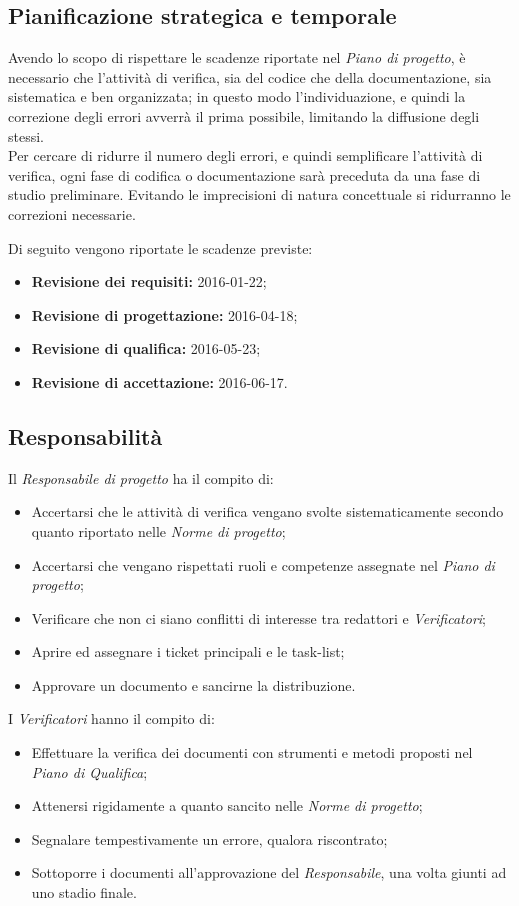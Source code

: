 \documentclass[a4paper]{article}
\begin{document}
		\subsection{Pianificazione strategica e temporale}
			Avendo lo scopo di rispettare le scadenze riportate nel \emph{Piano di progetto}, è necessario che l'attività 
			di verifica, sia del codice che della documentazione, sia sistematica e ben organizzata; in questo modo 
			l'individuazione, e quindi la correzione degli errori avverrà il prima possibile, limitando la diffusione 
			degli stessi.\\
			Per cercare di ridurre il numero degli errori, e quindi semplificare l'attività di verifica, ogni fase 
			di codifica o documentazione sarà preceduta da una fase di studio preliminare. Evitando le imprecisioni 
			di natura concettuale si ridurranno le correzioni necessarie.
			
			Di seguito vengono riportate le scadenze previste:
			\begin{itemize}
				\item \textbf{Revisione dei requisiti:} 2016-01-22;
				\item \textbf{Revisione di progettazione:} 2016-04-18;
				\item \textbf{Revisione di qualifica:} 2016-05-23;
				\item \textbf{Revisione di accettazione:} 2016-06-17.
			\end{itemize}
		\subsection{Responsabilità}
			Il \emph{Responsabile di progetto} ha il compito di:
			\begin{itemize}
				\item Accertarsi che le attività di verifica vengano svolte sistematicamente secondo quanto 
				riportato nelle \emph{Norme di progetto};
				\item Accertarsi che vengano rispettati ruoli e competenze assegnate nel \emph{Piano di progetto};
				\item Verificare che non ci siano conflitti di interesse tra redattori e \emph{Verificatori};
				\item Aprire ed assegnare i ticket principali e le task-list;
				\item Approvare un documento e sancirne la distribuzione.
			\end{itemize}
			I \emph{Verificatori} hanno il compito di:
			\begin{itemize}
				\item Effettuare la verifica dei documenti con strumenti e metodi proposti nel \emph{Piano di Qualifica};
				\item Attenersi rigidamente a quanto sancito nelle \emph{Norme di progetto};
				\item Segnalare tempestivamente un errore, qualora riscontrato;
				\item Sottoporre i documenti all'approvazione del \emph{Responsabile}, una volta giunti ad uno stadio finale.
			\end{itemize}
\end{document}

